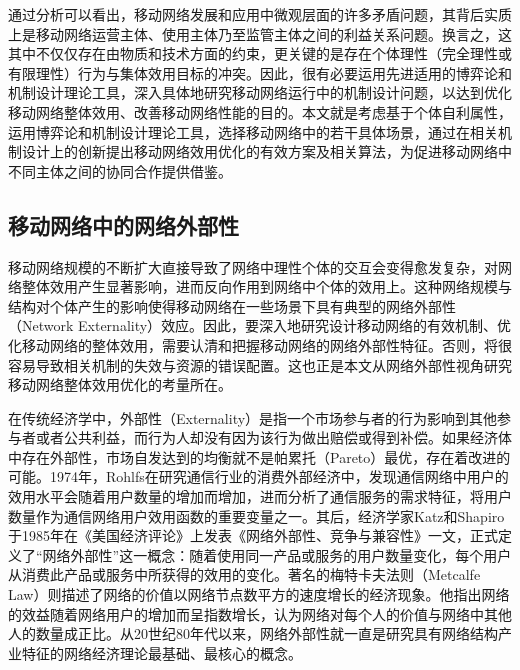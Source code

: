 通过分析可以看出，移动网络发展和应用中微观层面的许多矛盾问题，其背后实质上是移动网络运营主体、使用主体乃至监管主体之间的利益关系问题。换言之，这其中不仅仅存在由物质和技术方面的约束，更关键的是存在个体理性（完全理性或有限理性）行为与集体效用目标的冲突。因此，很有必要运用先进适用的博弈论和机制设计理论工具，深入具体地研究移动网络运行中的机制设计问题，以达到优化移动网络整体效用、改善移动网络性能的目的。本文就是考虑基于个体自利属性，运用博弈论和机制设计理论工具，选择移动网络中的若干具体场景，通过在相关机制设计上的创新提出移动网络效用优化的有效方案及相关算法，为促进移动网络中不同主体之间的协同合作提供借鉴。

\subsection{移动网络中的网络外部性}

移动网络规模的不断扩大直接导致了网络中理性个体的交互会变得愈发复杂，对网络整体效用产生显著影响，进而反向作用到网络中个体的效用上。这种网络规模与结构对个体产生的影响使得移动网络在一些场景下具有典型的{\kaishu 网络外部性（Network Externality）}效应。因此，要深入地研究设计移动网络的有效机制、优化移动网络的整体效用，需要认清和把握移动网络的网络外部性特征。否则，将很容易导致相关机制的失效与资源的错误配置。这也正是本文从网络外部性视角研究移动网络整体效用优化的考量所在。

在传统经济学中，外部性（Externality）是指一个市场参与者的行为影响到其他参与者或者公共利益，而行为人却没有因为该行为做出赔偿或得到补偿。如果经济体中存在外部性，市场自发达到的均衡就不是帕累托（Pareto）最优，存在着改进的可能。1974年，Rohlfs\cite{Rolfs}在研究通信行业的消费外部经济中，发现通信网络中用户的效用水平会随着用户数量的增加而增加，进而分析了通信服务的需求特征，将用户数量作为通信网络用户效用函数的重要变量之一。其后，经济学家Katz和Shapiro 于1985年在《美国经济评论》上发表《网络外部性、竞争与兼容性》一文，正式定义了“网络外部性”这一概念：随着使用同一产品或服务的用户数量变化，每个用户从消费此产品或服务中所获得的效用的变化\cite{Katz}。著名的梅特卡夫法则（Metcalfe Law）则描述了网络的价值以网络节点数平方的速度增长的经济现象。他指出网络的效益随着网络用户的增加而呈指数增长，认为网络对每个人的价值与网络中其他人的数量成正比。从20世纪80年代以来，网络外部性就一直是研究具有网络结构产业特征的网络经济理论最基础、最核心的概念。

